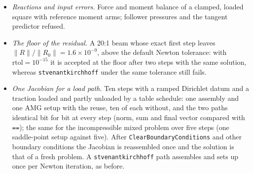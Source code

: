 \documentclass[11pt]{article}
\DeclareRobustCommand{\code}[1]{{\def\_{\textunderscore\allowbreak}\texttt{#1}}}
\begin{document}
\begin{itemize}[nosep]
    level of 12.5; end-face reactions $\sigma A$ on the reference area.
    With the finite-strain push-forward left in, this test fails by $3\%$.
  \item \emph{Reactions and input errors.}  Force and moment balance of a
    clamped, loaded square with reference moment arms; follower pressures
    and the tangent predictor refused.
  \item \emph{The floor of the residual.}  A 20:1 beam whose exact first
    step leaves $\|R\|/\|R_0\| = 1.6\times10^{-9}$, above the default Newton
    tolerance: with $\text{rtol} = 10^{-15}$ it is accepted at the floor
    after two steps with the same solution, whereas
    \code{st\_venant\_kirchhoff} under the same tolerance still fails.
  \item \emph{One Jacobian for a load path.}  Ten steps with a ramped
    Dirichlet datum and a traction loaded and partly unloaded by a table
    schedule: one assembly and one AMG setup with the reuse, ten of each
    without, and the two paths identical bit for bit at every step (norm,
    sum and final vector compared with \code{==}); the same for the
    incompressible mixed problem over five steps (one saddle-point setup
    against five).  After \code{ClearBoundaryConditions} and other boundary
    conditions the Jacobian is reassembled once and the solution is that of
    a fresh problem.  A \code{st\_venant\_kirchhoff} path assembles and sets
    up once per Newton iteration, as before.
\end{itemize}
\end{document}
